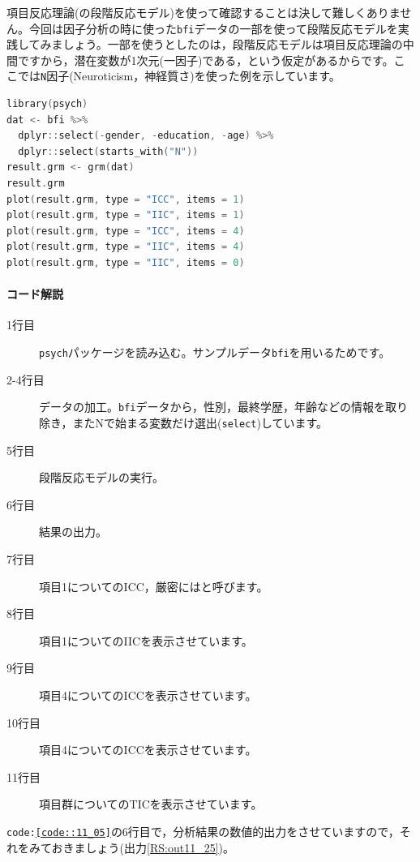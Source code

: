 \documentclass{ltjsbook}
\begin{document}
項目反応理論(の段階反応モデル)を使って確認することは決して難しくありません。今回は因子分析の時に使った\texttt{bfi}データの一部を使って段階反応モデルを実践してみましょう。一部を使うとしたのは，段階反応モデルは項目反応理論の中間ですから，潜在変数が1次元(一因子)である，という仮定があるからです。ここでは\texttt{N}因子(Neuroticism，神経質さ)を使った例を示しています。

\begin{lstlisting}[language=c++,label={code::11_05},caption={GRMの実行}]
library(psych)
dat <- bfi %>%
  dplyr::select(-gender, -education, -age) %>%
  dplyr::select(starts_with("N"))
result.grm <- grm(dat)
result.grm
plot(result.grm, type = "ICC", items = 1)
plot(result.grm, type = "IIC", items = 1)
plot(result.grm, type = "ICC", items = 4)
plot(result.grm, type = "IIC", items = 4)
plot(result.grm, type = "IIC", items = 0)
\end{lstlisting}
        
\paragraph{コード解説}
\begin{description}
        \item[1行目] \texttt{psych}パッケージを読み込む。サンプルデータ\texttt{bfi}を用いるためです。
        \item[2-4行目] データの加工。\texttt{bfi}データから，性別，最終学歴，年齢などの情報を取り除き，またNで始まる変数だけ選出(\texttt{select})しています。
        \item[5行目] 段階反応モデルの実行。
        \item[6行目] 結果の出力。
        \item[7行目] 項目1についてのICC，厳密にはと呼びます。
        \item[8行目] 項目1についてのIICを表示させています。
        \item[9行目] 項目4についてのICCを表示させています。
        \item[10行目] 項目4についてのICCを表示させています。
        \item[11行目]項目群についてのTICを表示させています。  
\end{description}

\texttt{code:\ref{code::11_05}}の6行目で，分析結果の数値的出力をさせていますので，それをみておきましょう(出力\ref{RS:out11_25})。
\end{document}
